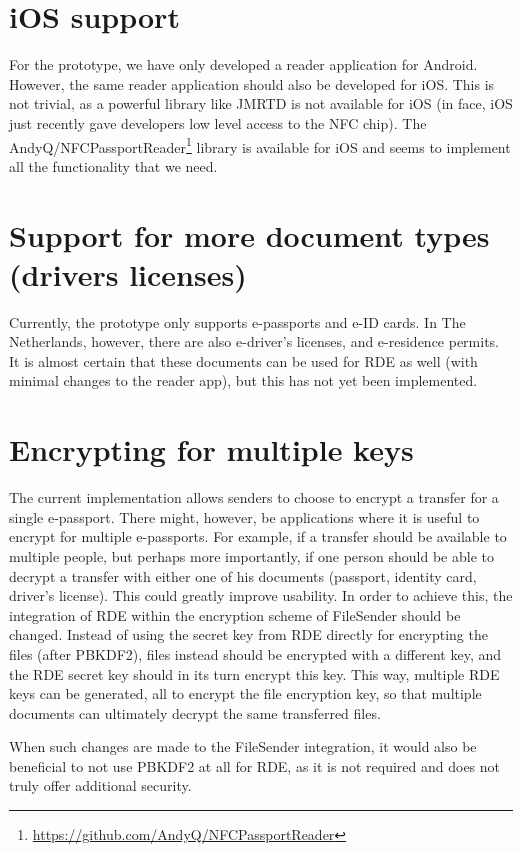 \section{iOS support}
\label{sec:ios-support}
For the prototype, we have only developed a reader application for Android.
However, the same reader application should also be developed for iOS.
This is not trivial, as a powerful library like JMRTD is not available for iOS (in face, iOS just recently gave developers low level access to the NFC chip).
The \textsf{AndyQ/NFCPassportReader}\footnote{\url{https://github.com/AndyQ/NFCPassportReader}} library is available for iOS and seems to implement all the functionality that we need.

\section{Support for more document types (drivers licenses)}
\label{sec:support-for-more-document-types}
Currently, the prototype only supports e-passports and e-ID cards.
In The Netherlands, however, there are also e-driver's licenses, and e-residence permits.
It is almost certain that these documents can be used for RDE as well (with minimal changes to the reader app), but this has not yet been implemented.

\section{Encrypting for multiple keys}
\label{sec:encrypting-for-multiple-keys}
The current implementation allows senders to choose to encrypt a transfer for a single e-passport.
There might, however, be applications where it is useful to encrypt for multiple e-passports.
For example, if a transfer should be available to multiple people, but perhaps more importantly, if one person should be able to decrypt a transfer with either one of his documents (passport, identity card, driver's license).
This could greatly improve usability. 
In order to achieve this, the integration of RDE within the encryption scheme of FileSender should be changed.
Instead of using the secret key from RDE directly for encrypting the files (after PBKDF2), files instead should be encrypted with a different key, and the RDE secret key should in its turn encrypt this key.
This way, multiple RDE keys can be generated, all to encrypt the file encryption key, so that multiple documents can ultimately decrypt the same transferred files.

When such changes are made to the FileSender integration, it would also be beneficial to not use PBKDF2 at all for RDE, as it is not required and does not truly offer additional security.

